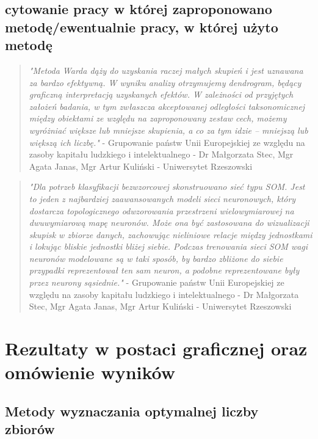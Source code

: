 \documentclass{article}
\begin{document}
    \subsection{cytowanie pracy w której zaproponowano metodę/ewentualnie pracy, w której użyto metodę} 
        \begin{quotation}
            \textit{"Metoda Warda dąży do uzyskania raczej małych skupień i jest uznawana za bardzo efektywną. W wyniku analizy otrzymujemy dendrogram,
            będący graficzną interpretacją uzyskanych efektów. W zależności od przyjętych założeń badania, w tym zwłaszcza akceptowanej odległości
            taksonomicznej między obiektami ze względu na zaproponowany zestaw cech, możemy wyróżniać większe lub mniejsze skupienia, a co za tym
            idzie – mniejszą lub większą ich liczbę."}
            \newline- Grupowanie państw Unii Europejskiej ze względu na zasoby kapitału ludzkiego i intelektualnego - Dr Małgorzata Stec, 
            Mgr Agata Janas, Mgr Artur Kuliński - Uniwersytet Rzeszowski
        \end{quotation}
        \begin{quotation}
            \textit{"Dla potrzeb klasyfikacji bezwzorcowej skonstruowano sieć typu SOM. Jest to jeden z najbardziej zaawansowanych 
            modeli sieci neuronowych, który dostarcza topologicznego odwzorowania przestrzeni wielowymiarowej na dwuwymiarową mapę neuronów. 
            Może ona być zastosowana do wizualizacji skupisk w zbiorze danych, zachowując nieliniowe relacje między jednostkami i lokując 
            bliskie jednostki bliżej siebie. Podczas trenowania sieci SOM wagi neuronów modelowane są w taki sposób, by bardzo zbliżone do 
            siebie przypadki reprezentował ten sam neuron, a podobne reprezentowane były przez neurony sąsiednie."}
            \newline- Grupowanie państw Unii Europejskiej ze względu na zasoby kapitału ludzkiego i intelektualnego - Dr Małgorzata Stec, 
            Mgr Agata Janas, Mgr Artur Kuliński - Uniwersytet Rzeszowski
        \end{quotation}
    

\section{Rezultaty w postaci graficznej oraz omówienie wyników}
    \subsection{Metody wyznaczania optymalnej liczby zbiorów}
\end{document}
